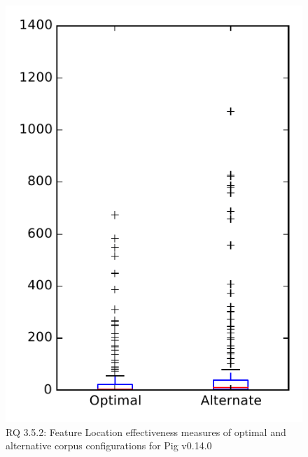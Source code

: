 
\begin{figure}
\centering
\includegraphics[height=0.4\textheight]{figures/combo/flt_rq2_pig}
\caption{RQ 3.5.2: Feature Location effectiveness measures of optimal and alternative corpus configurations for Pig v0.14.0}
\label{fig:combo:flt:rq2:pig}
\end{figure}
